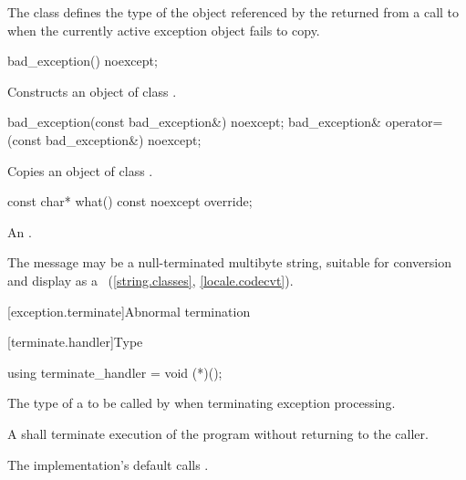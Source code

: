 \pnum
The class
defines the type of the object
referenced by the 
returned from a call to 
when the currently active exception object fails to copy.

%
\begin{itemdecl}
bad_exception() noexcept;
\end{itemdecl}

\begin{itemdescr}
\pnum
\effects
Constructs an object of class
.
\end{itemdescr}

%
%
\begin{itemdecl}
bad_exception(const bad_exception&) noexcept;
bad_exception& operator=(const bad_exception&) noexcept;
\end{itemdecl}

\begin{itemdescr}
\pnum
\effects
Copies an object of class
.
\end{itemdescr}

%
\begin{itemdecl}
const char* what() const noexcept override;
\end{itemdecl}

\begin{itemdescr}
\pnum
\returns
An  \ntbs{}.

\pnum
\remarks
The message may be a null-terminated multibyte string,
suitable for conversion and display as a
~(\ref{string.classes}, \ref{locale.codecvt}).
\end{itemdescr}

[exception.terminate]{Abnormal termination}

[terminate.handler]{Type }

%
\begin{itemdecl}
using terminate_handler = void (*)();
\end{itemdecl}

\begin{itemdescr}
\pnum
The type of a
to be called by
%
when terminating exception processing.

\pnum
\required
A  shall
terminate execution of the program without returning to the caller.

\pnum
{}
The implementation's default  calls
.%
%
\end{itemdescr}

